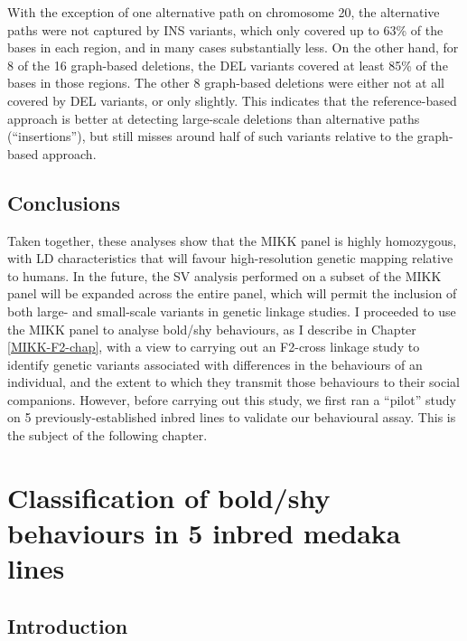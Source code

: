 \documentclass[
]{book}
\begin{document}
With the exception of one alternative path on chromosome 20, the alternative paths were not captured by INS variants, which only covered up to 63\% of the bases in each region, and in many cases substantially less. On the other hand, for 8 of the 16 graph-based deletions, the DEL variants covered at least 85\% of the bases in those regions. The other 8 graph-based deletions were either not at all covered by DEL variants, or only slightly. This indicates that the reference-based approach is better at detecting large-scale deletions than alternative paths (``insertions''), but still misses around half of such variants relative to the graph-based approach.

\hypertarget{conclusions}{%
\section{Conclusions}\label{conclusions}}

Taken together, these analyses show that the MIKK panel is highly homozygous, with LD characteristics that will favour high-resolution genetic mapping relative to humans. In the future, the SV analysis performed on a subset of the MIKK panel will be expanded across the entire panel, which will permit the inclusion of both large- and small-scale variants in genetic linkage studies. I proceeded to use the MIKK panel to analyse bold/shy behaviours, as I describe in Chapter \ref{MIKK-F2-chap}, with a view to carrying out an F2-cross linkage study to identify genetic variants associated with differences in the behaviours of an individual, and the extent to which they transmit those behaviours to their social companions. However, before carrying out this study, we first ran a ``pilot'' study on 5 previously-established inbred lines to validate our behavioural assay. This is the subject of the following chapter.

\hypertarget{Pilot-chap}{%
\chapter{Classification of bold/shy behaviours in 5 inbred medaka lines}\label{Pilot-chap}}

\hypertarget{introduction}{%
\section{Introduction}\label{introduction}}
\end{document}
